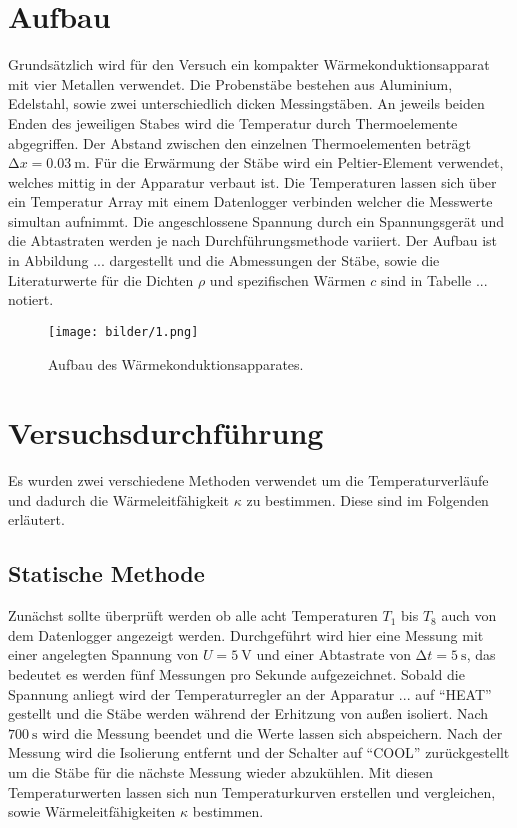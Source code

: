 \section{Aufbau}
Grundsätzlich wird für den Versuch ein kompakter Wärmekonduktionsapparat mit vier Metallen verwendet.
Die Probenstäbe bestehen aus Aluminium, Edelstahl, sowie zwei unterschiedlich dicken Messingstäben. An jeweils beiden Enden des jeweiligen Stabes wird die Temperatur durch Thermoelemente abgegriffen. Der Abstand zwischen den einzelnen Thermoelementen beträgt $\increment x = \SI{0.03}{\meter}$. Für die Erwärmung der Stäbe wird ein Peltier-Element verwendet, welches mittig in der Apparatur verbaut ist. Die Temperaturen lassen sich über ein Temperatur Array mit einem Datenlogger verbinden welcher die Messwerte simultan aufnimmt. Die angeschlossene Spannung durch ein Spannungsgerät und die Abtastraten werden je nach Durchführungsmethode variiert. Der Aufbau ist in Abbildung ... dargestellt und die Abmessungen der Stäbe, sowie die Literaturwerte für die Dichten $\rho$ und spezifischen Wärmen $c$ sind in Tabelle ... notiert.

\begin{figure}
    \centering
    \texttt{[image: bilder/1.png]}
    \caption{Aufbau des Wärmekonduktionsapparates. \cite{skript}} 
    \label{fig:1}
\end{figure}
\section{Versuchsdurchführung}
Es wurden zwei verschiedene Methoden verwendet um die Temperaturverläufe und dadurch die Wärmeleitfähigkeit $\kappa$ zu bestimmen. Diese sind im Folgenden erläutert.

\subsection{Statische Methode}
Zunächst sollte überprüft werden ob alle acht Temperaturen $T_{1}$ bis $T_{8}$ auch von dem Datenlogger angezeigt werden. Durchgeführt wird hier eine Messung mit einer angelegten Spannung von $U = \SI{5}{\volt}$ und einer Abtastrate von $\increment t = \SI{5}{\second}$, das bedeutet es werden fünf Messungen pro Sekunde aufgezeichnet. Sobald die Spannung anliegt wird der Temperaturregler an der Apparatur ... auf \enquote{HEAT} gestellt und die Stäbe werden während der Erhitzung von außen isoliert. Nach $\SI{700}{\second}$ wird die Messung beendet und die Werte lassen sich abspeichern.
Nach der Messung wird die Isolierung entfernt und der Schalter auf \enquote{COOL} zurückgestellt um die Stäbe für die nächste Messung wieder abzukühlen.
Mit diesen Temperaturwerten lassen sich nun Temperaturkurven erstellen und vergleichen, sowie Wärmeleitfähigkeiten $\kappa$ bestimmen.
